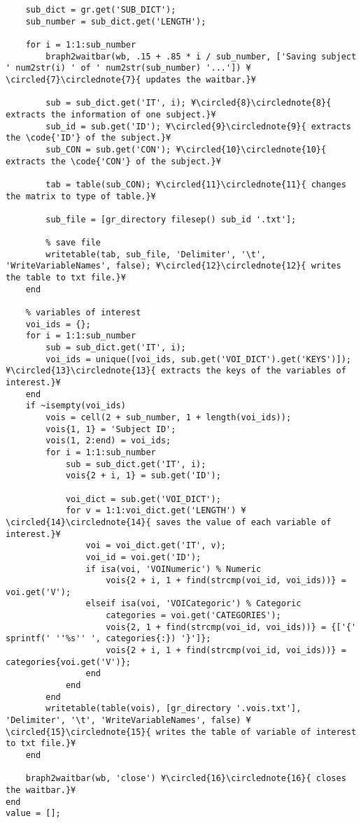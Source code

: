 \documentclass{tufte-handout}
\begin{document}
\begin{lstlisting}
    sub_dict = gr.get('SUB_DICT');
    sub_number = sub_dict.get('LENGTH');
    
    for i = 1:1:sub_number
        braph2waitbar(wb, .15 + .85 * i / sub_number, ['Saving subject ' num2str(i) ' of ' num2str(sub_number) '...']) ¥\circled{7}\circlednote{7}{ updates the waitbar.}¥
        
        sub = sub_dict.get('IT', i); ¥\circled{8}\circlednote{8}{ extracts the information of one subject.}¥
        sub_id = sub.get('ID'); ¥\circled{9}\circlednote{9}{ extracts the \code{'ID'} of the subject.}¥
        sub_CON = sub.get('CON'); ¥\circled{10}\circlednote{10}{ extracts the \code{'CON'} of the subject.}¥

        tab = table(sub_CON); ¥\circled{11}\circlednote{11}{ changes the matrix to type of table.}¥

        sub_file = [gr_directory filesep() sub_id '.txt'];

        % save file
        writetable(tab, sub_file, 'Delimiter', '\t', 'WriteVariableNames', false); ¥\circled{12}\circlednote{12}{ writes the table to txt file.}¥
    end
    
    % variables of interest
    voi_ids = {};
    for i = 1:1:sub_number
        sub = sub_dict.get('IT', i);
        voi_ids = unique([voi_ids, sub.get('VOI_DICT').get('KEYS')]); ¥\circled{13}\circlednote{13}{ extracts the keys of the variables of interest.}¥
    end
    if ~isempty(voi_ids)
        vois = cell(2 + sub_number, 1 + length(voi_ids));
        vois{1, 1} = 'Subject ID';
        vois(1, 2:end) = voi_ids;
        for i = 1:1:sub_number
            sub = sub_dict.get('IT', i);
            vois{2 + i, 1} = sub.get('ID');
            
            voi_dict = sub.get('VOI_DICT');
            for v = 1:1:voi_dict.get('LENGTH') ¥\circled{14}\circlednote{14}{ saves the value of each variable of interest.}¥
                voi = voi_dict.get('IT', v);
                voi_id = voi.get('ID');
                if isa(voi, 'VOINumeric') % Numeric
                    vois{2 + i, 1 + find(strcmp(voi_id, voi_ids))} = voi.get('V');
                elseif isa(voi, 'VOICategoric') % Categoric
                    categories = voi.get('CATEGORIES');
                    vois{2, 1 + find(strcmp(voi_id, voi_ids))} = {['{' sprintf(' ''%s'' ', categories{:}) '}']}; 
                    vois{2 + i, 1 + find(strcmp(voi_id, voi_ids))} = categories{voi.get('V')};
                end
            end
        end
        writetable(table(vois), [gr_directory '.vois.txt'], 'Delimiter', '\t', 'WriteVariableNames', false) ¥\circled{15}\circlednote{15}{ writes the table of variable of interest to txt file.}¥
    end
    
    braph2waitbar(wb, 'close') ¥\circled{16}\circlednote{16}{ closes the waitbar.}¥
end
value = [];

\end{lstlisting}
\end{document}
